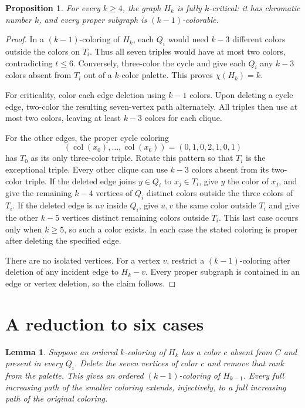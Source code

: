 \documentclass[11pt]{amsart}
\newtheorem{lemma}[theorem]{Lemma}
\newtheorem{proposition}[theorem]{Proposition}
\newcommand{\col}{\operatorname{col}}
\begin{document}
\begin{proposition}\label{prop:critical}
For every $k\geq4$, the graph $H_k$ is fully $k$-critical: it has
chromatic number $k$, and every proper subgraph is $(k-1)$-colorable.
\end{proposition}

\begin{proof}
In a $(k-1)$-coloring of $H_k$, each $Q_i$ would need $k-3$
different colors outside the colors on $T_i$.  Thus all seven triples
would have at most two colors, contradicting $t\leq6$.  Conversely,
three-color the cycle and give each $Q_i$ any $k-3$ colors absent from
$T_i$ out of a $k$-color palette.  This proves $\chi(H_k)=k$.

For criticality, color each edge deletion using $k-1$ colors.  Upon
deleting a cycle edge, two-color the resulting seven-vertex path
alternately.  All triples then use at most two colors, leaving at
least $k-3$ colors for each clique.

For the other edges, the proper cycle coloring
\begin{equation}\label{eq:pattern}
 (\col(x_0),\ldots,\col(x_6))=(0,1,0,2,1,0,1)
\end{equation}
has $T_0$ as its only three-color triple.  Rotate this pattern so that
$T_i$ is the exceptional triple.  Every other clique can use $k-3$
colors absent from its two-color triple.  If the deleted edge joins
$y\in Q_i$ to $x_j\in T_i$, give $y$ the color of $x_j$, and give the
remaining $k-4$ vertices of $Q_i$ distinct colors outside the three
colors of $T_i$.  If the deleted edge is $uv$ inside $Q_i$, give $u,v$
the same color outside $T_i$ and give the other $k-5$ vertices
distinct remaining colors outside $T_i$.  This last case occurs only
when $k\geq5$, so such a color exists.  In each case the stated
coloring is proper after deleting the specified edge.

There are no isolated vertices.  For a vertex $v$, restrict a
$(k-1)$-coloring after deletion of any incident edge to $H_k-v$.
Every proper subgraph is contained in an edge or vertex deletion, so
the claim follows.
\end{proof}

\section{A reduction to six cases}

\begin{lemma}\label{lem:extension}
Suppose an ordered $k$-coloring of $H_k$ has a color $c$ absent from
$C$ and present in every $Q_i$.  Delete the seven vertices of color
$c$ and remove that rank from the palette.  This gives an ordered
$(k-1)$-coloring of $H_{k-1}$.  Every full increasing path of the
smaller coloring extends, injectively, to a full increasing path of
the original coloring.
\end{lemma}
\end{document}
